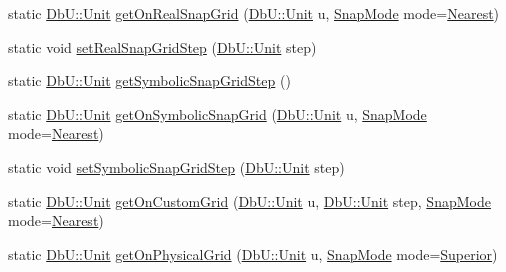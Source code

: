 \begin{DoxyCompactItemize}
\item 
static \mbox{\hyperlink{group__DbUGroup_ga4fbfa3e8c89347af76c9628ea06c4146}{Db\+U\+::\+Unit}} \mbox{\hyperlink{group__DbUGroup_ga8746e486f153aa37ee469c1604eba5c0}{get\+On\+Real\+Snap\+Grid}} (\mbox{\hyperlink{group__DbUGroup_ga4fbfa3e8c89347af76c9628ea06c4146}{Db\+U\+::\+Unit}} u, \mbox{\hyperlink{group__DbUGroup_ga1082168d6f9956ebba22ab8bbec21637}{Snap\+Mode}} mode=\mbox{\hyperlink{group__DbUGroup_gga1082168d6f9956ebba22ab8bbec21637a65e6f47eb16779b8974a80d6145a2db5}{Nearest}})
\item 
static void \mbox{\hyperlink{group__DbUGroup_ga202cc3aa3364c2224647a29dde047fae}{set\+Real\+Snap\+Grid\+Step}} (\mbox{\hyperlink{group__DbUGroup_ga4fbfa3e8c89347af76c9628ea06c4146}{Db\+U\+::\+Unit}} step)
\item 
static \mbox{\hyperlink{group__DbUGroup_ga4fbfa3e8c89347af76c9628ea06c4146}{Db\+U\+::\+Unit}} \mbox{\hyperlink{group__DbUGroup_ga687a9134729b107c42fb7f69596c4c3b}{get\+Symbolic\+Snap\+Grid\+Step}} ()
\item 
static \mbox{\hyperlink{group__DbUGroup_ga4fbfa3e8c89347af76c9628ea06c4146}{Db\+U\+::\+Unit}} \mbox{\hyperlink{group__DbUGroup_gad1b0c0f3680093cf5a63d901312c925d}{get\+On\+Symbolic\+Snap\+Grid}} (\mbox{\hyperlink{group__DbUGroup_ga4fbfa3e8c89347af76c9628ea06c4146}{Db\+U\+::\+Unit}} u, \mbox{\hyperlink{group__DbUGroup_ga1082168d6f9956ebba22ab8bbec21637}{Snap\+Mode}} mode=\mbox{\hyperlink{group__DbUGroup_gga1082168d6f9956ebba22ab8bbec21637a65e6f47eb16779b8974a80d6145a2db5}{Nearest}})
\item 
static void \mbox{\hyperlink{group__DbUGroup_ga9ccd423c8f268ef54770f4663e6c9304}{set\+Symbolic\+Snap\+Grid\+Step}} (\mbox{\hyperlink{group__DbUGroup_ga4fbfa3e8c89347af76c9628ea06c4146}{Db\+U\+::\+Unit}} step)
\item 
static \mbox{\hyperlink{group__DbUGroup_ga4fbfa3e8c89347af76c9628ea06c4146}{Db\+U\+::\+Unit}} \mbox{\hyperlink{group__DbUGroup_ga87323d9038656dceabffc37d45de408a}{get\+On\+Custom\+Grid}} (\mbox{\hyperlink{group__DbUGroup_ga4fbfa3e8c89347af76c9628ea06c4146}{Db\+U\+::\+Unit}} u, \mbox{\hyperlink{group__DbUGroup_ga4fbfa3e8c89347af76c9628ea06c4146}{Db\+U\+::\+Unit}} step, \mbox{\hyperlink{group__DbUGroup_ga1082168d6f9956ebba22ab8bbec21637}{Snap\+Mode}} mode=\mbox{\hyperlink{group__DbUGroup_gga1082168d6f9956ebba22ab8bbec21637a65e6f47eb16779b8974a80d6145a2db5}{Nearest}})
\item 
static \mbox{\hyperlink{group__DbUGroup_ga4fbfa3e8c89347af76c9628ea06c4146}{Db\+U\+::\+Unit}} \mbox{\hyperlink{group__DbUGroup_ga9419025221579f4277475c65655be3dc}{get\+On\+Physical\+Grid}} (\mbox{\hyperlink{group__DbUGroup_ga4fbfa3e8c89347af76c9628ea06c4146}{Db\+U\+::\+Unit}} u, \mbox{\hyperlink{group__DbUGroup_ga1082168d6f9956ebba22ab8bbec21637}{Snap\+Mode}} mode=\mbox{\hyperlink{group__DbUGroup_gga1082168d6f9956ebba22ab8bbec21637a8ce92cf7ff7627c46baf85612f9ad847}{Superior}})

\end{DoxyCompactItemize}
